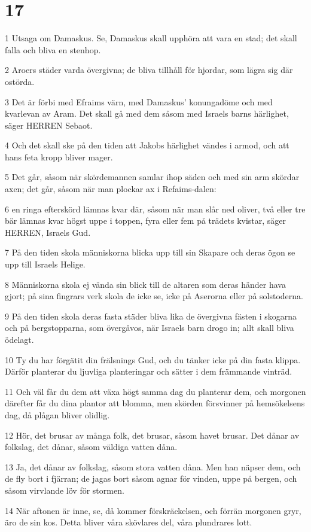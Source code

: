 \chapter{17}

\par 1 Utsaga om Damaskus. Se, Damaskus skall upphöra att vara en stad; det skall falla och bliva en stenhop.
\par 2 Aroers städer varda övergivna; de bliva tillhåll för hjordar, som lägra sig där ostörda.
\par 3 Det är förbi med Efraims värn, med Damaskus' konungadöme och med kvarlevan av Aram. Det skall gå med dem såsom med Israels barns härlighet, säger HERREN Sebaot.
\par 4 Och det skall ske på den tiden att Jakobs härlighet vändes i armod, och att hans feta kropp bliver mager.
\par 5 Det går, såsom när skördemannen samlar ihop säden och med sin arm skördar axen; det går, såsom när man plockar ax i Refaims-dalen:
\par 6 en ringa efterskörd lämnas kvar där, såsom när man slår ned oliver, två eller tre bär lämnas kvar högst uppe i toppen, fyra eller fem på trädets kvistar, säger HERREN, Israels Gud.
\par 7 På den tiden skola människorna blicka upp till sin Skapare och deras ögon se upp till Israels Helige.
\par 8 Människorna skola ej vända sin blick till de altaren som deras händer hava gjort; på sina fingrars verk skola de icke se, icke på Aserorna eller på solstoderna.
\par 9 På den tiden skola deras fasta städer bliva lika de övergivna fästen i skogarna och på bergstopparna, som övergåvos, när Israels barn drogo in; allt skall bliva ödelagt.
\par 10 Ty du har förgätit din frälsnings Gud, och du tänker icke på din fasta klippa. Därför planterar du ljuvliga planteringar och sätter i dem främmande vinträd.
\par 11 Och väl får du dem att växa högt samma dag du planterar dem, och morgonen därefter får du dina plantor att blomma, men skörden försvinner på hemsökelsens dag, då plågan bliver olidlig.
\par 12 Hör, det brusar av många folk, det brusar, såsom havet brusar. Det dånar av folkslag, det dånar, såsom väldiga vatten dåna.
\par 13 Ja, det dånar av folkslag, såsom stora vatten dåna. Men han näpser dem, och de fly bort i fjärran; de jagas bort såsom agnar för vinden, uppe på bergen, och såsom virvlande löv för stormen.
\par 14 När aftonen är inne, se, då kommer förskräckelsen, och förrän morgonen gryr, äro de sin kos. Detta bliver våra skövlares del, våra plundrares lott.

